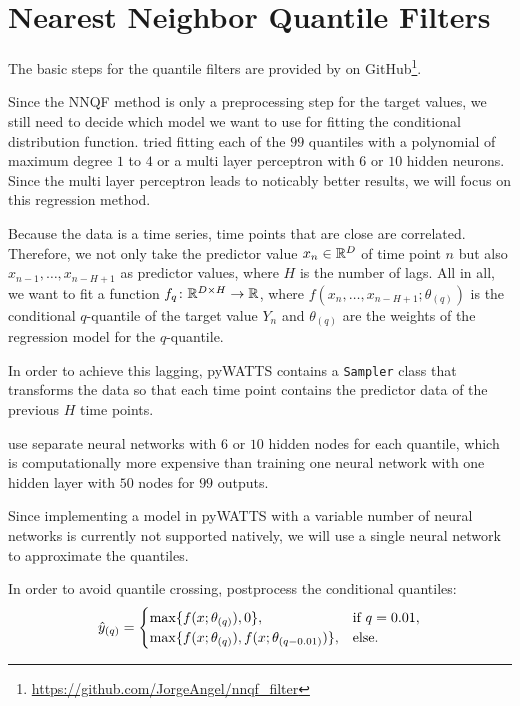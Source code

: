 \section{Nearest Neighbor Quantile Filters}
\label{sec:implementation-nnqf}

The basic steps for the quantile filters are provided by \Textcite{Ordiano2019} 
on GitHub\footnote{\url{https://github.com/JorgeAngel/nnqf_filter}}. 

Since the NNQF method is only a preprocessing step for the target values, 
we still need to decide which model we want to use for fitting the 
conditional distribution function. 
\Textcite{Ordiano2019} tried fitting each of the \(99\) quantiles 
with a polynomial of maximum degree \(1\) to \(4\) or a multi layer perceptron 
with \(6\) or \(10\) hidden neurons. Since the multi layer perceptron leads to 
noticably better results, we will focus on this regression method. 

Because the data is a time series, time points that are close are correlated. 
Therefore, we not only take the predictor value \(x_n \in \mathbb{R}^D\) of time point \(n\) 
but also \(x_{n-1}, \ldots, x_{n-H+1}\) as predictor values, where \(H\) is the number of lags.
All in all, we want to fit a function \(f_q\colon \mathbb{R}^{D\times H} \rightarrow \mathbb{R}\), 
where \( f(x_n, \ldots, x_{n-H+1}; \theta_{(q)})\) is the conditional 
\(q\)-quantile of the target value \(Y_n\) and \(\theta_{(q)}\) are the weights 
of the regression model for the \(q\)-quantile.

In order to achieve this lagging, pyWATTS contains a \texttt{Sampler} class
that transforms the data so that each time point contains the 
predictor data of the previous \(H\) time points.

\Textcite{Ordiano2019} use separate neural networks with \(6\) or \(10\) hidden nodes for each quantile, 
which is computationally more expensive than training one neural network with 
one hidden layer with \(50\) nodes for \(99\) outputs. 

Since implementing a model in pyWATTS with a variable number of neural networks is currently 
not supported natively, we will use a single neural network to approximate the quantiles.

In order to avoid quantile crossing, \Textcite{Ordiano2019} postprocess the conditional quantiles:
\[ \hat{y}_{(q)} = \begin{cases}
    \max\{ f(x; \theta_{(q)}), 0 \}, &\text{if } q = 0.01, \\
    \max\{ f(x; \theta_{(q)}), f(x; \theta_{(q-0.01)}) \}, &\text{else.}
\end{cases}\]

